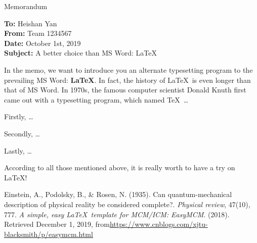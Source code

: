 \documentclass[12pt]{article}  %
\begin{document}
\begin{letter}{Memorandum}
\begin{flushleft}  %
\textbf{To:} Heishan Yan\\
\textbf{From:} Team 1234567\\
\textbf{Date:} October 1st, 2019\\
\textbf{Subject:} A better choice than MS Word: \LaTeX
\end{flushleft}

In the memo, we want to introduce you an alternate typesetting program to the prevailing MS Word: \textbf{\LaTeX}. In fact, the history of \LaTeX\ is even longer than that of MS Word. In 1970s, the famous computer scientist Donald Knuth first came out with a typesetting program, which named \TeX\ \ldots

Firstly, \ldots

Secondly, \ldots

Lastly, \ldots

According to all those mentioned above, it is really worth to have a try on \LaTeX! 
\end{letter}


\begin{thebibliography}{99}
 Einstein, A., Podolsky, B., \& Rosen, N. (1935). Can quantum-mechanical description of physical reality be considered complete?. \emph{Physical review}, 47(10), 777.
 \emph{A simple, easy \LaTeX\ template for MCM/ICM: EasyMCM}. (2018). Retrieved December 1, 2019, from\url{https://www.cnblogs.com/xjtu-blacksmith/p/easymcm.html}
\end{thebibliography}
\end{document}

